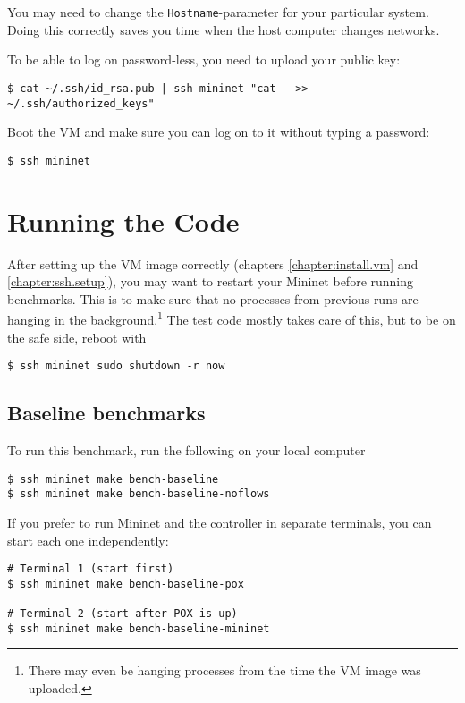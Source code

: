 You may need to change the \texttt{Hostname}-parameter for your particular
system.  Doing this correctly saves you time when the host computer changes
networks.

To be able to log on password-less, you need to upload your public key:

\begin{verbatim}
$ cat ~/.ssh/id_rsa.pub | ssh mininet "cat - >> ~/.ssh/authorized_keys"
\end{verbatim}

Boot the VM and make sure you can log on to it without typing a password:

\begin{verbatim}
$ ssh mininet
\end{verbatim}



\section{Running the Code}
\label{chapter:appendix.benchmark}

After setting up the VM image correctly (chapters \ref{chapter:install.vm}
and \ref{chapter:ssh.setup}), you may want to restart your Mininet
before running benchmarks.  This is to make sure that no processes from
previous runs are hanging in the background.\footnote{There may even be
hanging processes from the time the VM image was uploaded.} The test code
mostly takes care of this, but to be on the safe side, reboot with

\begin{Verbatim}
$ ssh mininet sudo shutdown -r now
\end{Verbatim}

\subsection{Baseline benchmarks}
\label{chapter:appendix.baseline.benchmark}

To run this benchmark, run the following on your local computer

\begin{Verbatim}
$ ssh mininet make bench-baseline
$ ssh mininet make bench-baseline-noflows
\end{Verbatim}

If you prefer to run Mininet and the controller in separate terminals, you
can start each one independently:

\begin{Verbatim}
# Terminal 1 (start first)
$ ssh mininet make bench-baseline-pox

# Terminal 2 (start after POX is up)
$ ssh mininet make bench-baseline-mininet
\end{Verbatim}

